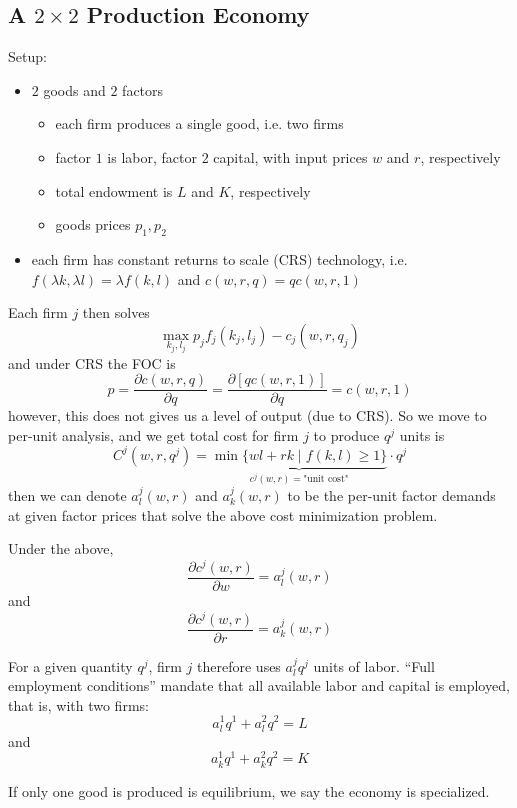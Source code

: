 \subsection{A $2 \times 2$ Production Economy}
\label{sec:2-times-2-prod}

Setup:

\begin{itemize}
\item $2$ goods and $2$ factors
  \begin{itemize}
  \item each firm produces a single good, i.e. two firms
  \item factor $1$ is labor, factor $2$ capital, with input prices $w$
    and $r$, respectively
  \item total endowment is $L$ and $K$, respectively
  \item goods prices $p_1, p_2$
  \end{itemize}
\item each firm has constant returns to scale (CRS) technology,
  i.e. $f(\lambda k, \lambda l) = \lambda f(k, l)$ and $c(w,r,q) = q
  c(w,r,1)$

\end{itemize}

Each firm $j$ then solves
\[
\max_{k_j, l_j} p_j f_j(k_j, l_j) - c_j(w, r, q_j)
\]
and under CRS the FOC is
\[
p = \frac{\partial c(w,r,q)}{\partial q} 
= \frac{\partial [qc(w,r,1)]}{\partial q} = c(w,r,1)
\]
however, this does not gives us a level of output (due to CRS). So we
move to per-unit analysis, and we get total cost for firm $j$ to
produce $q^j$ units is
\[
C^j(w, r, q^j) = 
\underbrace{\min\{wl + rk \; | \; f(k, l) \geq 1 \} }_{c^j(w,r) = \text{"unit cost"}}
\cdot q^j
\]
then we can denote $a^j_l(w,r)$ and $a^j_k(w,r)$ to be the per-unit
factor demands at given factor prices that solve the above cost
minimization problem.

\begin{lemma}
  Under the above,
  \[
  \frac{\partial c^j(w,r)}{\partial w} = a^j_l(w,r)
  \]
  and
  \[
  \frac{\partial c^j(w,r)}{\partial r} = a^j_k(w,r)
  \]
\end{lemma}

For a given quantity $q^j$, firm $j$ therefore uses $a^j_lq^j$ units
of labor. ``Full employment conditions'' mandate that all available
labor and capital is employed, that is, with two firms:
\[
a^1_l q^1 + a^2_lq^2 = L
\]
and
\[
a^1_k q^1 + a^2_k q^2 = K
\]


\begin{definition}[Specialization]
  If only one good is produced is equilibrium, we say the economy is
  specialized.
\end{definition}

